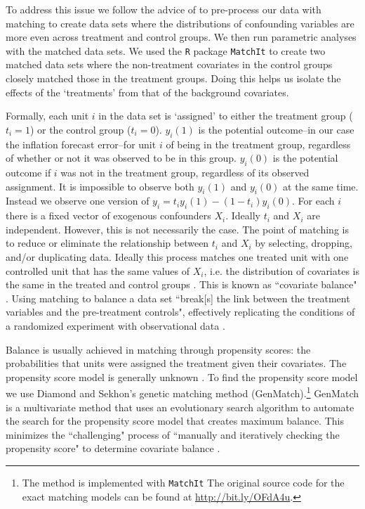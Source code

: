 \documentclass[a4paper]{article}
\begin{document}
To address this issue we follow the advice of \cite{Ho2007} to pre-process our data with matching to create data sets where the distributions of confounding variables are more even across treatment and control groups. We then run parametric analyses with the matched data sets. We used the {\tt{R}} package {\tt{MatchIt}} \citep{matchit2011} to create two matched data sets where the non-treatment covariates in the control groups closely matched those in the treatment groups. Doing this helps us isolate the effects of the `treatments' from that of the background covariates. 

Formally, each unit $i$ in the data set is `assigned' to either the treatment group ($t_{i} = 1$) or the control group ($t_{i} = 0$). $y_{i}(1)$ is the potential outcome--in our case the inflation forecast error--for unit $i$ of being in the treatment group, regardless of whether or not it was observed to be in this group. $y_{i}(0)$ is the potential outcome if $i$ was not in the treatment group, regardless of its observed assignment. It is impossible to observe both $y_{i}(1)$ and $y_{i}(0)$ at the same time. Instead we observe one version of $y_{i}=t_{i}y_{i}(1)-(1-t_{i})y_i(0)$. For each $i$ there is a fixed vector of exogenous confounders $X_{i}$. Ideally $t_{i}$ and $X_{i}$ are independent. However, this is not necessarily the case. The point of matching is to reduce or eliminate the relationship between $t_{i}$  and $X_{i}$ by selecting, dropping, and/or duplicating data. Ideally this process matches one treated unit with one controlled unit that has the same values of $X_{i}$, i.e. the distribution of covariates is the same in the treated and control groups \citep{matchit2011}. This is known as ``covariate balance" \cite[1]{Diamond2012}. Using matching to balance a data set ``break[s] the link between the treatment variables and the pre-treatment controls", effectively replicating the conditions of a randomized experiment with observational data \cite[][2--3]{matchit2011}. 

Balance is usually achieved in matching through propensity scores: the probabilities that units were assigned the treatment given their covariates. The propensity score model is generally unknown \citep{Drake1993}. To find the propensity score model we use Diamond and Sekhon's \citeyearpar{Diamond2012} genetic matching method (GenMatch).\footnote{The method is implemented with {\tt{MatchIt}} The original source code for the exact matching models can be found at {\url{http://bit.ly/OFdA4u}}.} GenMatch is a multivariate method that uses an evolutionary search algorithm to automate the search for the propensity score model that creates maximum balance. This minimizes the ``challenging" process of ``manually and iteratively checking the propensity score" to determine covariate balance \citep[][2]{Diamond2012}. 
\end{document}
